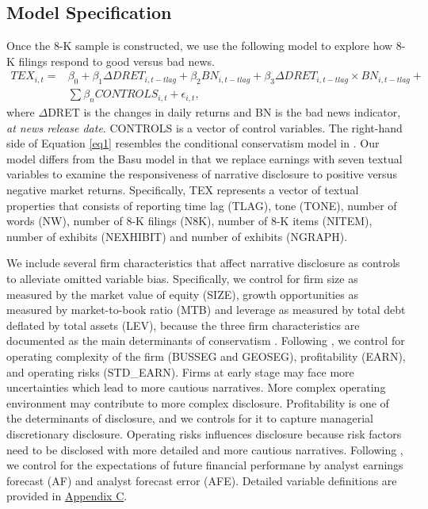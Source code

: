 \documentclass[letterpaper,12pt]{article}
\begin{document}
\begin{spacing}{1.5}
\subsection{Model Specification} \label{sec3.4}
Once the 8-K sample is constructed, we use the following model to explore how 8-K filings respond to good versus bad news.
\begin{equation}
\begin{aligned}
\label{eq1}
TEX_{i,t}=
&\beta_0+\beta_1\Delta DRET_{i,t-tlag}+\beta_2BN_{i,t-tlag}+\beta_3\Delta DRET_{i,t-tlag}\times BN_{i,t-tlag}+\\
&\sum\beta_nCONTROLS_{i,t}+\epsilon_{i,t},
\end{aligned}
\end{equation}
where $\Delta$DRET is the changes in daily returns and BN is the bad news indicator, \textit{at news release date}. CONTROLS is a vector of control variables. The right-hand side of Equation \eqref{eq1} resembles the conditional conservatism model in . Our model differs from the Basu model in that we replace earnings with seven textual variables to examine the responsiveness of narrative disclosure to positive versus negative market returns. Specifically, TEX represents a vector of textual properties that consists of reporting time lag (TLAG), tone (TONE), number of words (NW), number of 8-K filings (N8K), number of 8-K items (NITEM), number of exhibits (NEXHIBIT) and number of exhibits (NGRAPH). 

We include several firm characteristics that affect narrative disclosure as controls to alleviate omitted variable bias. Specifically, we control for firm size as measured by the market value of equity (SIZE), growth opportunities as measured by market-to-book ratio (MTB) and leverage as measured by total debt deflated by total assets (LEV), because the three firm characteristics are documented as the main determinants of conservatism \cite{wattsConservatismAccountingPart2003, qiangEffectsContractingLitigation2007, khanEstimationEmpiricalProperties2009, garcialaraEconomicDeterminantsConditional2009}. Following , we control for operating complexity of the firm (BUSSEG and GEOSEG), profitability (EARN), and operating risks (STD\_EARN). Firms at early stage may face more uncertainties which lead to more cautious narratives. More complex operating environment may contribute to more complex disclosure. Profitability is one of the determinants of disclosure, and we controls for it to capture managerial discretionary disclosure. Operating risks influences disclosure because risk factors need to be disclosed with more detailed and more cautious narratives. Following , we control for the expectations of future financial performane by analyst earnings forecast (AF) and analyst forecast error (AFE). Detailed variable definitions are provided in \hyperref[appc]{Appendix C}.


\end{spacing}
\end{document}
